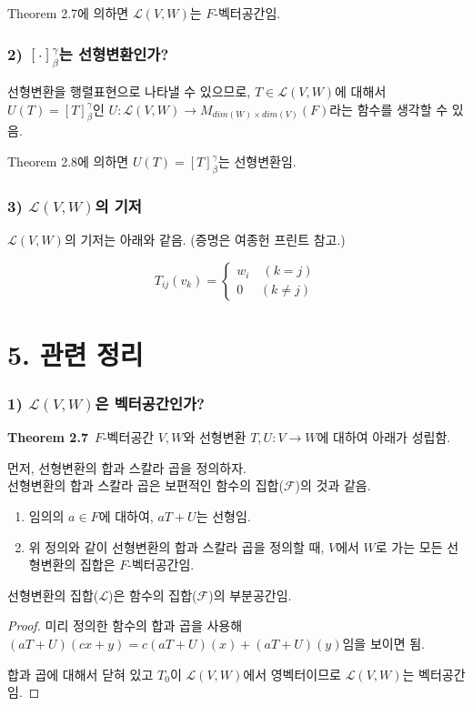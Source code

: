 Theorem 2.7에 의하면 $\mathcal{L}(V,W)$는 $F$-벡터공간임.

\subsubsection*{2) $[\cdot]_{\beta}^{\gamma}$는 선형변환인가?}
선형변환을 행렬표현으로 나타낼 수 있으므로, $T \in \mathcal{L}(V,W)$에 대해서 $U(T)=[T]_{\beta}^{\gamma}$인 $U:\mathcal{L}(V,W) \rightarrow M_{dim(W) \times dim(V)}(F)$라는 함수를 생각할 수 있음.

Theorem 2.8에 의하면 $U(T)=[T]_{\beta}^{\gamma}$는 선형변환임.

\subsubsection*{3) $\mathcal{L}(V,W)$의 기저}
$\mathcal{L}(V,W)$의 기저는 아래와 같음. (증명은 여종헌 프린트 참고.)

$$
T_{ij}(v_k)=\begin{cases}
    w_i\quad(k=j)\\
    0\,\,\quad(k \neq j)
\end{cases}
$$




\section*{5. 관련 정리}

\subsubsection*{1) $\mathcal{L}(V,W)$은 벡터공간인가?}
\textbf{Theorem 2.7}\, $F$-벡터공간 $V,W$와 선형변환 $T,U:V \rightarrow W$에 대하여 아래가 성립함.

먼저, 선형변환의 합과 스칼라 곱을 정의하자.\\
선형변환의 합과 스칼라 곱은 보편적인 함수의 집합($\mathcal{F}$)의 것과 같음.

\begin{enumerate}
    \item 임의의 $a \in F$에 대하여, $aT+U$는 선형임.
    \item 위 정의와 같이 선형변환의 합과 스칼라 곱을 정의할 때, $V$에서 $W$로 가는 모든 선형변환의 집합은 $F$-벡터공간임.
\end{enumerate}

선형변환의 집합($\mathcal{L}$)은 함수의 집합($\mathcal{F}$)의 부분공간임.

\begin{proof}
미리 정의한 함수의 합과 곱을 사용해 $(aT+U)(cx+y)=c(aT+U)(x)+(aT+U)(y)$임을 보이면 됨.

합과 곱에 대해서 닫혀 있고 $T_0$이 $\mathcal{L}(V,W)$에서 영벡터이므로 $\mathcal{L}(V,W)$는 벡터공간임.
\end{proof}


